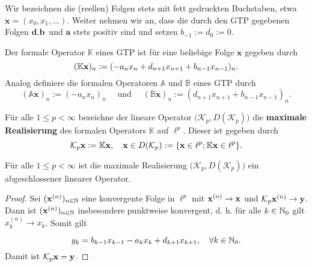 \begin{verein}
Wir bezeichnen die (reellen) Folgen stets mit fett gedruckten Buchstaben, etwa $\textbf{x}=(x_0,x_1,\dots)$. Weiter nehmen wir an, dass die durch den GTP gegebenen Folgen $\textbf{d},\textbf{b}$ und $\textbf{a}$ stets positiv sind und setzen $b_{-1}:=d_0:=0$.
\end{verein}


\begin{konstr}
Der formale Operator  $\mathbb  K$ eines GTP ist für eine beliebige Folge $\textbf{x}$ gegeben durch
\begin{equation*}
(\mathbb K\textnormal{\textbf{x}})_n:=(-a_nx_n + d_{n+1}x_{n+1} + b_{n-1}x_{n-1})_n.
\end{equation*}
Analog definiere die formalen Operatoren $\mathbb A$ und $\mathbb B$ eines GTP durch
\begin{equation*}
(\mathbb A\textbf{x})_n:=(-a_nx_n)_n\quad\text{ und }\quad (\mathbb B\textbf{x})_n:=(d_{n+1}x_{n+1} + b_{n-1}x_{n-1})_n.
\end{equation*}
\end{konstr}

\begin{defi}Für alle $1\leq p<\infty$ bezeichne  der lineare Operator $\big(\mathcal K_p, D(\mathcal K_p)\big)$ die \textbf{maximale Realisierung} des formalen Operators $\mathbb K$ auf $\ell^p$. Dieser ist gegeben durch
\begin{equation*}
\mathcal K_p\textnormal{\textbf{x}}:= \mathbb K\textnormal{\textbf{x}},\quad \textbf{x}\in D(\mathcal K_p):=\{\textnormal{\textbf{x}}\in \ell^p; \mathbb K\textnormal{\textbf{x}} \in \ell^p\}.
\end{equation*}
\end{defi}

\begin{lem}\label{Abgeschlossenheit des maximalen Operators K_p}
Für alle $1\leq p<\infty$ ist die maximale Realisierung $\big(\mathcal K_p, D(\mathcal K_p)\big)$ ein abgeschlossener linearer Operator.
\end{lem}

\begin{proof}
Sei $(\textnormal{\textbf{x}}^{(n)})_{n\in\mathbb{N}}$ eine konvergente Folge in $\ell^p$ mit $\textnormal{\textbf{x}}^{(n)}\to \textnormal{\textbf{x}}$ und $\mathcal  K_p\textnormal{\textbf{x}}^{(n)}\to\textnormal{\index{}\textbf y}$. Dann ist $(\textnormal{\textbf{x}}^{(n)})_{n\in\mathbb{N}}$ insbesondere punktweise konvergent, d. h. für alle $k\in\mathbb{N}_0$ gilt $x_k^{(n)}\to x_k$. Somit gilt

\begin{equation*}
    y_k = b_{k-1}x_{k-1} -a_k x_k + d_{k+1} x_{k+1},\quad\forall k\in\mathbb{N}_0.
\end{equation*}
Damit ist $\mathcal  K_p\textnormal{\textbf{x}} = \textnormal{\index{}\textbf y}$.
\end{proof}


